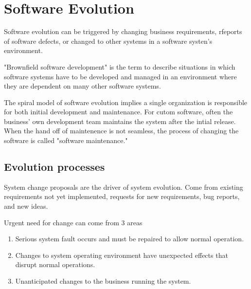 \documentclass{article}
\begin{document}
 
\setcounter{section}{8}

\section{Software Evolution}
Software evolution can be triggered by changing business requirements, rfeports of software defects, or changed to other systems in a software systen's environment.

"Brownfield software development" is the term to describe situations in which software systems have to be developed and managed in an environment where they are dependent on many other software systems.

The spiral model of software evolution implies a single organization is responsible for both initial development and maintenance.
For cutom software, often the business' own development team maintains the system after the intial release.
When the hand off of maintenence is not seamless, the process of changing the software is called "software maintenance."

\subsection{Evolution processes}
System change proposals are the driver of system evolution.  Come from existing requirements not yet implemented, requests for new requirements, bug reports, and new ideas.

Urgent need for change can come from 3 areas
\begin{enumerate}
    \item Serious system fault occurs and must be repaired to allow normal operation.
    \item Changes to system operating environment have unexpected effects that disrupt normal operations.
    \item Unanticipated changes to the business running the system.
\end{enumerate}
\end{document}
